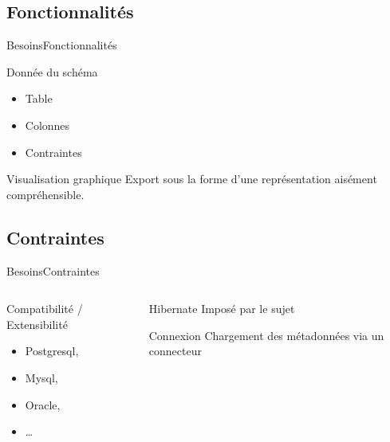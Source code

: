 \subsection{Fonctionnalités}
\begin{frame}{Besoins}{Fonctionnalités}
\begin{block}{Donnée du schéma}
	\begin{itemize}
	\item Table
	\item Colonnes
	\item Contraintes
	\end{itemize}
\end{block}
\begin{block}{Visualisation graphique}
Export sous la forme d'une représentation aisément compréhensible.
\end{block}
\end{frame}

\subsection{Contraintes}
\begin{frame}{Besoins}{Contraintes}

 \begin{columns}[t]
  \begin{column}{0.5\textwidth}
	\begin{alertblock}{Compatibilité / Extensibilité}
		\begin{itemize}
		\item Postgresql,
		\item Mysql,
		\item Oracle,
		\item \ldots
		\end{itemize}
	\end{alertblock}
  \end{column}
  
  \begin{column}{0.5\textwidth}
	\begin{alertblock}{Hibernate}
	Imposé par le sujet
	\end{alertblock}
	\begin{alertblock}{Connexion}
	Chargement des métadonnées via un connecteur
	\end{alertblock}
  \end{column}
 \end{columns}  
\end{frame}